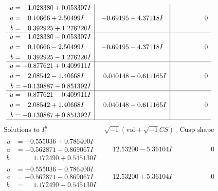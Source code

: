 \documentclass[1p]{elsarticle_modified}
\theoremstyle{definition}
\newcommand{\I}{\sqrt{-1}}
\begin{document}
$$\begin{array}{c|c|c}
\begin{aligned}
u &= \phantom{-}1.028380 + 0.053307 I \\
a &= \phantom{-}0.10666 + 2.50499 I \\
b &= \phantom{-}0.392925 + 1.276220 I\end{aligned}
 & -0.69195 + 4.37118 I & \phantom{-0.000000 } 0 \\ \hline\begin{aligned}
u &= \phantom{-}1.028380 - 0.053307 I \\
a &= \phantom{-}0.10666 - 2.50499 I \\
b &= \phantom{-}0.392925 - 1.276220 I\end{aligned}
 & -0.69195 - 4.37118 I & \phantom{-0.000000 } 0 \\ \hline\begin{aligned}
u &= -0.877621 + 0.409911 I \\
a &= \phantom{-}2.08542 - 1.40668 I \\
b &= -0.130887 - 0.851392 I\end{aligned}
 & \phantom{-}0.040148 - 0.611165 I & \phantom{-0.000000 } 0 \\ \hline\begin{aligned}
u &= -0.877621 - 0.409911 I \\
a &= \phantom{-}2.08542 + 1.40668 I \\
b &= -0.130887 + 0.851392 I\end{aligned}
 & \phantom{-}0.040148 + 0.611165 I & \phantom{-0.000000 } 0\\
 \hline 
 \end{array}$$\newpage$$\begin{array}{c|c|c}  
\text{Solutions to }I^u_{1}& \I (\text{vol} + \sqrt{-1}CS) & \text{Cusp shape}\\
 \hline 
\begin{aligned}
u &= -0.555036 + 0.786400 I \\
a &= -0.562871 + 0.869067 I \\
b &= \phantom{-}1.172490 + 0.545130 I\end{aligned}
 & \phantom{-}12.53200 - 5.36104 I & \phantom{-0.000000 } 0 \\ \hline\begin{aligned}
u &= -0.555036 - 0.786400 I \\
a &= -0.562871 - 0.869067 I \\
b &= \phantom{-}1.172490 - 0.545130 I\end{aligned}
 & \phantom{-}12.53200 + 5.36104 I & \phantom{-0.000000 } 0 \\ \hline\begin{aligned}

\end{aligned}
\end{array}$$
\end{document}
